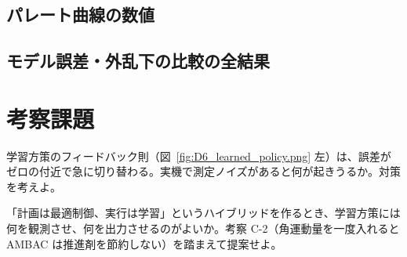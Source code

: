 
\subsection{パレート曲線の数値}


\subsection{モデル誤差・外乱下の比較の全結果}


\section*{考察課題}
\begin{exercise}
学習方策のフィードバック則（図~\ref{fig:D6_learned_policy.png} 左）は、誤差がゼロの付近で急に切り替わる。実機で測定ノイズがあると何が起きうるか。対策を考えよ。
\end{exercise}
\begin{exercise}
「計画は最適制御、実行は学習」というハイブリッドを作るとき、学習方策には何を観測させ、何を出力させるのがよいか。考察 C-2（角運動量を一度入れると AMBAC は推進剤を節約しない）を踏まえて提案せよ。
\end{exercise}
